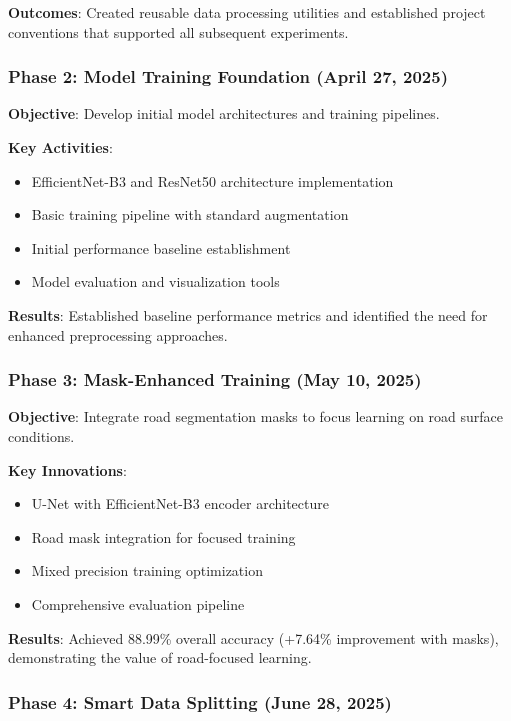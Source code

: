 \documentclass[12pt,twocolumn]{article}
\begin{document}
\textbf{Outcomes}: Created reusable data processing utilities and established project conventions that supported all subsequent experiments.

\subsubsection{Phase 2: Model Training Foundation (April 27, 2025)}

\textbf{Objective}: Develop initial model architectures and training pipelines.

\textbf{Key Activities}:
\begin{itemize}[itemsep=1pt,parsep=0pt,topsep=2pt]
\item EfficientNet-B3 and ResNet50 architecture implementation
\item Basic training pipeline with standard augmentation
\item Initial performance baseline establishment
\item Model evaluation and visualization tools
\end{itemize}

\textbf{Results}: Established baseline performance metrics and identified the need for enhanced preprocessing approaches.

\subsubsection{Phase 3: Mask-Enhanced Training (May 10, 2025)}

\textbf{Objective}: Integrate road segmentation masks to focus learning on road surface conditions.

\textbf{Key Innovations}:
\begin{itemize}[itemsep=1pt,parsep=0pt,topsep=2pt]
\item U-Net with EfficientNet-B3 encoder architecture
\item Road mask integration for focused training
\item Mixed precision training optimization
\item Comprehensive evaluation pipeline
\end{itemize}

\textbf{Results}: Achieved 88.99\% overall accuracy (+7.64\% improvement with masks), demonstrating the value of road-focused learning.

\subsubsection{Phase 4: Smart Data Splitting (June 28, 2025)}
\end{document}

